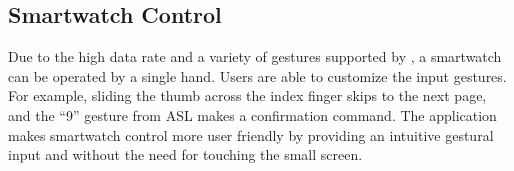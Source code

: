 \documentclass{sigchi}
\begin{document}
\subsection{Smartwatch Control}

Due to the high data rate and a variety of gestures supported by \getTitleName, a smartwatch can be operated by a single hand. Users are able to customize the input gestures. For example, sliding the thumb across the index finger skips to the next page, and the ``9'' gesture from ASL makes a confirmation command. The application makes smartwatch control more user friendly by providing an intuitive gestural input and without the need for touching the small screen. 

    


\end{document}
